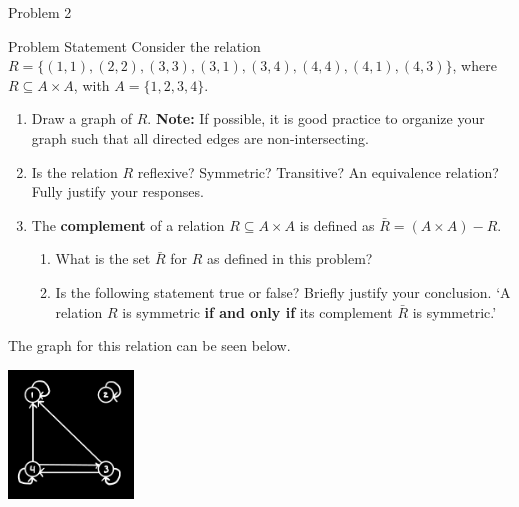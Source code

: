 \begin{problem}{Problem 2}
    \begin{statement}{Problem Statement}
        Consider the relation $R = \{(1,1),(2,2),(3,3),(3,1),(3,4),(4,4),(4,1),(4,3)\}$, where $R \subseteq A \times A$, with $A = \{1,2,3,4\}$.

        \begin{enumerate}[label = (\alph*)]
            \item Draw a graph of $R$. \textbf{Note:} If possible, it is good practice to organize your graph such that all directed edges are non-intersecting.
            \item Is the relation $R$ reflexive? Symmetric? Transitive? An equivalence relation? Fully justify your responses.
            \item The \textbf{complement} of a relation $R \subseteq A \times A$ is defined as $\bar{R} = (A \times A) - R$.
            \begin{enumerate}[label = (\arabic*)]
                \item What is the set $\bar{R}$ for $R$ as defined in this problem?
                \item Is the following statement true or false? Briefly justify your conclusion. `A relation $R$ is symmetric \textbf{if and only if} its complement $\bar{R}$ is symmetric.'
            \end{enumerate}
        \end{enumerate}
    \end{statement}

    \begin{Highlight}
        The graph for this relation can be seen below.
        \begin{center}
            \includegraphics[width = 0.25\textwidth]{./Images/P2-Graph.jpg}
        \end{center}
    \end{Highlight}


\end{problem}
